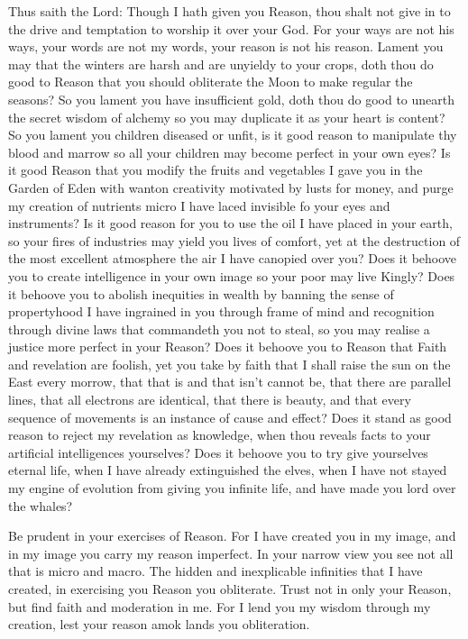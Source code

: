 Thus saith the Lord: Though I hath given you Reason, thou shalt not give in to the drive and temptation to worship it over your God.
For your ways are not his ways, your words are not my words, your reason is not his reason. Lament you may that the winters are harsh and are unyieldy to your crops, doth thou do good to Reason that you should obliterate the Moon to make regular the seasons? So you lament you have insufficient gold, doth thou do good to unearth the secret wisdom of alchemy so you may duplicate it as your heart is content? So you lament you children diseased or unfit, is it good reason to manipulate thy blood and marrow so all your children may become perfect in your own eyes? Is it good Reason that you modify the fruits and vegetables I gave you in the Garden of Eden with wanton creativity motivated by lusts for money, and purge my creation of nutrients micro I have laced invisible fo your eyes and instruments? Is it good reason for you to use the oil I have placed in your earth, so your fires of industries may yield you lives of comfort, yet at the destruction of the most excellent atmosphere the air I have canopied over you? Does it behoove you to create intelligence in your own image so your poor may live Kingly? Does it behoove you to abolish inequities in wealth by banning the sense of propertyhood I have ingrained in you through frame of mind and recognition through divine laws that commandeth you not to steal, so you may realise a justice more perfect in your Reason? Does it behoove you to Reason that Faith and revelation are foolish, yet you take by faith that I shall raise the sun on the East every morrow, that that is and that isn’t cannot be, that there are parallel lines, that all electrons are identical, that there is beauty, and that every sequence of movements is an instance of cause and effect? Does it stand as good reason to reject my revelation as knowledge, when thou reveals facts to your artificial intelligences yourselves? Does it behoove you to try give yourselves eternal life, when I have already extinguished the elves, when I have not stayed my engine of evolution from giving you infinite life, and have made you lord over the whales? 

Be prudent in your exercises of Reason. For I have created you in my image, and in my image you carry my reason imperfect. In your narrow view you see not all that is micro and macro. The hidden and inexplicable infinities that I have created, in exercising you Reason you obliterate. Trust not in only your Reason, but find faith and moderation in me. For I lend you my wisdom through my creation, lest your reason amok lands you obliteration. 



